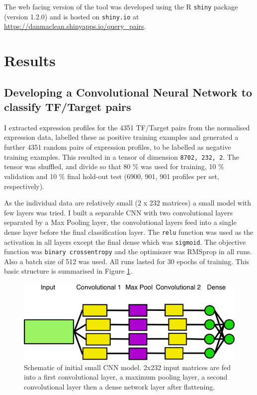 \documentclass[12pt,a4paper,]{article}
\begin{document}
The web facing version of the tool was developed using the R \texttt{shiny} package (version 1.2.0) and is hosted on \texttt{shiny.io} at \href{}{https://danmaclean.shinyapps.io/query\_pairs}.

\hypertarget{results}{%
\section{Results}\label{results}}

\hypertarget{developing-a-convolutional-neural-network-to-classify-tftarget-pairs}{%
\subsection{Developing a Convolutional Neural Network to classify TF/Target pairs}\label{developing-a-convolutional-neural-network-to-classify-tftarget-pairs}}

I extracted expression profiles for the 4351 TF/Target pairs from the normalised expression data, labelled these as positive training examples and generated a further 4351 random pairs of expression profiles, to be labelled as negative training examples. This resulted in a tensor of dimension \texttt{8702,\ 232,\ 2}. The tensor was shuffled, and divide so that 80 \% was used for training, 10 \% validation and 10 \% final hold-out test (6900, 901, 901 profiles per set, respectively).

As the individual data are relatively small (2 x 232 matrices) a small model with few layers was tried. I built a separable CNN with two convolutional layers separated by a Max Pooling layer, the convolutional layers feed into a single dense layer before the final classification layer. The \texttt{relu} function was used as the activation in all layers except the final dense which was \texttt{sigmoid}. The objective function was \texttt{binary\ crossentropy} and the optimiszer was RMSprop in all runs. Also a batch size of 512 was used. All runs lasted for 30 epochs of training. This basic structure is summarised in Figure \ref{fig:networkdiagram}.

\begin{figure}

{\centering \includegraphics[width=0.7\linewidth,height=0.7\textheight]{conv1} 

}

\caption{Schematic of initial small CNN model. 2x232 input matrices are fed into a first convolutional layer, a maximum pooling layer, a second convolutional layer then a dense network layer after flattening.}\label{fig:networkdiagram}
\end{figure}
\end{document}
